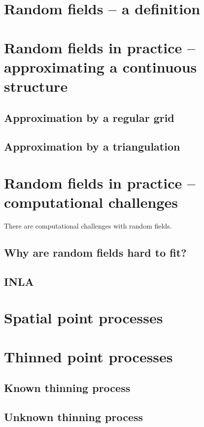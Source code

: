 \section{Random fields -- a definition}

\section{Random fields in practice -- approximating a continuous structure}
\subsection{Approximation by a regular grid}
\subsection{Approximation by a triangulation}

\section{Random fields in practice -- computational challenges}
There are computational challenges with random fields.

\subsection{Why are random fields hard to fit?}

\subsection{INLA}


\section{Spatial point processes}



\section{Thinned point processes}

\subsection{Known thinning process}

\subsection{Unknown thinning process}


